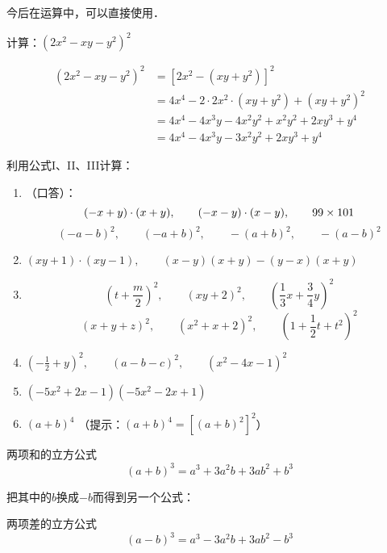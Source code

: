 今后在运算中，可以直接使用．

\begin{example}
    计算：$(2x^2-xy-y^2)^2$
\end{example}

\begin{solution}
    \[\begin{split}
(2x^2-xy-y^2)^2 &= [2x^2-(xy+y^2)]^2\\
&=4x^4-2\cdot 2x^2\cdot (xy+y^2)+  (xy+y^2)^2\\
&=     4x^4-4x^3y-4x^2y^2+x^2y^2+2xy^3+y^4\\ 
&=       4x^4-4x^3y-3x^2y^2+2xy^3+y^4
    \end{split}\]
\end{solution}

\begin{ex}
    利用公式I、II、III计算：
\begin{enumerate}
    \item （口答）：
    \[(-x+y)\cdot (x+y), \qquad (-x-y)\cdot (x-y),\qquad 99\times 101\]
    \[(-a-b)^2,\qquad (-a+b)^2,\qquad -(a+b)^2,\qquad -(a-b)^2 \]

    \item $(xy+1)\cdot (xy-1),\qquad (x-y)(x+y)-(y-x)(x+y)$
    \item \[\left(t+\frac{m}{2}\right)^2,\qquad (xy+2)^2,\qquad \left(\frac{1}{3}x+\frac{3}{4}y\right)^2\]
     \[(x+y+z)^2,\qquad (x^2+x+2)^2,\qquad \left(1+\frac{1}{2}t+t^2\right)^2\]
\item $\left(-\frac{1}{2}+y\right)^2,\qquad (a-b-c)^2,\qquad (x^2-4x-1)^2$
\item $(-5x^2+2x-1)(-5x^2-2x+1)$
\item $(a+b)^4$  （提示：$(a+b)^4=[(a+b)^2]^2$）
    \end{enumerate}
\end{ex}

\begin{blk}{两项和的立方公式}
    \begin{equation*}
        (a+b)^3=a^3+3a^2b+3ab^2+b^3 \tag{IV}
    \end{equation*}
\end{blk}

把其中的$b$换成$-b$而得到另一个公式：

\begin{blk}{两项差的立方公式}
    \begin{equation*}
        (a-b)^3=a^3-3a^2b+3ab^2-b^3 \tag{V}  
    \end{equation*}
\end{blk}

